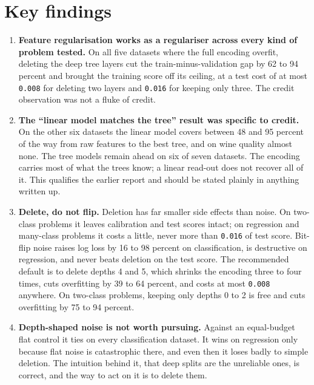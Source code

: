 \documentclass[11pt,a4paper]{article}
\newcommand{\num}[1]{\texttt{#1}}
\begin{document}
\section{Key findings}

\begin{enumerate}

\item \textbf{Feature regularisation works as a regulariser across every kind
of problem tested.} On all five datasets where the full encoding overfit,
deleting the deep tree layers cut the train-minus-validation gap by 62 to 94
percent and brought the training score off its ceiling, at a test cost of at
most \num{0.008} for deleting two layers and \num{0.016} for keeping only
three. The credit observation was not a fluke of credit.

\item \textbf{The ``linear model matches the tree'' result was specific to
credit.} On the other six datasets the linear model covers between 48 and 95
percent of the way from raw features to the best tree, and on wine quality
almost none. The tree models remain ahead on six of seven datasets. The
encoding carries most of what the trees know; a linear read-out does not
recover all of it. This qualifies the earlier report and should be stated
plainly in anything written up.

\item \textbf{Delete, do not flip.} Deletion has far smaller side effects
than noise. On two-class problems it leaves calibration and test scores intact;
on regression and many-class problems it costs a little, never more than
\num{0.016} of test score. Bit-flip noise raises log loss by 16 to 98 percent
on classification, is destructive on regression, and never beats deletion on
the test score. The recommended default is to delete depths 4 and 5, which
shrinks the encoding three to four times, cuts overfitting by 39 to 64 percent,
and costs at most \num{0.008} anywhere. On
two-class problems, keeping only depths 0 to 2 is free and cuts overfitting
by 75 to 94 percent.

\item \textbf{Depth-shaped noise is not worth pursuing.} Against an
equal-budget flat control it ties on every classification dataset. It wins on
regression only because flat noise is catastrophic there, and even then it
loses badly to simple deletion. The intuition behind it, that deep splits are
the unreliable ones, is correct, and the way to act on it is to delete them.


\end{enumerate}
\end{document}
